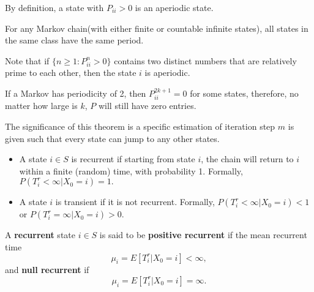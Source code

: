 \begin{refsection}
\begin{remark}
	By definition, a state with $P_{ii} > 0$ is an aperiodic state.
\end{remark}

\begin{theorem}\cite[166]{gallager2013stochastic}
	For any Markov chain(with either finite or countable infinite states), all states in the same class have the same period.
\end{theorem}







\begin{remark}
Note that if $\{n\geq 1: P^n_{ii} > 0\}$ contains two distinct numbers that are relatively prime to each other, then the state $i$ is aperiodic.
\end{remark}


\begin{remark}
	If a Markov has periodicity of 2, then $P^{2k+1}_{ii} = 0$ for some states, therefore, no matter how large is $k$, $P$ will still have zero entries. 
\end{remark}


\begin{remark}
	The significance of this theorem is a specific estimation of iteration step $m$ is given such that every state can jump to any other states. 
\end{remark}

\begin{definition}\cite[121]{privault2013understanding}
	\begin{itemize}
		\item A state $i\in S$ is recurrent if starting from state $i$, the chain will return to $i$ within a finite (random) time, with probability 1. Formally, $P(T_i^r<\infty|X_0 = i) = 1.$
		\item A state $i$ is transient if it is not recurrent. Formally, 
		$P(T_i^r<\infty|X_0 = i) < 1$ or $P(T_i^r=\infty|X_0 = i) > 0.$
	\end{itemize}
\end{definition}



\begin{definition}\cite[125]{privault2013understanding}
	A \textbf{recurrent} state $i\in S$ is said to be \textbf{positive recurrent} if the mean recurrent time
	$$\mu_i = E[T_i^r|X_0=i] < \infty,$$
	and \textbf{null recurrent} if
	$$\mu_i = E[T_i^r|X_0=i] = \infty.$$
\end{definition}


\end{refsection}

